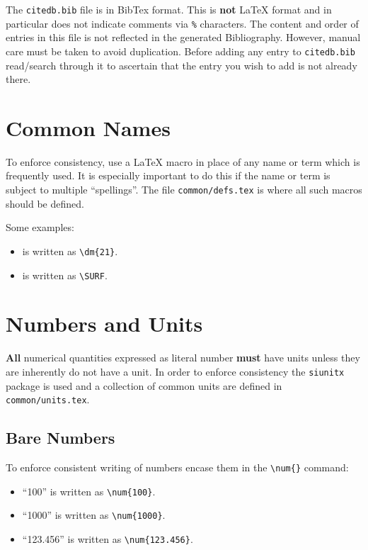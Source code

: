 The \texttt{citedb.bib} file is in BibTex format.
This is \textbf{not} \LaTeX{} format and in particular does not
indicate comments via \texttt{\%} characters.
The content and order of entries in this file is not reflected in the
generated Bibliography.
However, manual care must be taken to avoid duplication.
Before adding any entry to \texttt{citedb.bib} read/search through it
to ascertain that the entry you wish to add is not already there.

\section{Common Names}

To enforce consistency, use a \LaTeX{} macro in place of any name or
term which is frequently used.
It is especially important to do this if the name or term is subject
to multiple ``spellings''.
The file \texttt{common/defs.tex} is where all such macros should be defined.

Some examples:

\begin{itemize}
\item {} is written as \verb|\dm{21}|.
\item \SURF is written as \verb|\SURF|.
\end{itemize}

\section{Numbers and Units}

\textbf{All} numerical quantities expressed as literal number
\textbf{must} have units unless they are inherently do not have a unit.
In order to enforce consistency the \texttt{siunitx} package is used
and a collection of common units are defined in
\texttt{common/units.tex}.

\subsection{Bare Numbers}

To enforce consistent writing of numbers encase them in the
\verb|\num{}| command:

\begin{itemize}
\item ``\num{100}'' is written as \verb|\num{100}|.
\item ``\num{1000}'' is written as \verb|\num{1000}|.
\item ``\num{123.456}'' is written as \verb|\num{123.456}|.
\end{itemize}


